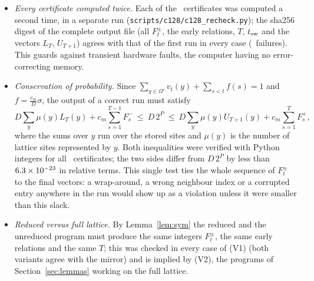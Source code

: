 \begin{itemize}
\item[(V4)] \emph{Every certificate computed twice.} Each of the \XRecheckN\ certificates was computed a second time, in a separate run (\texttt{scripts/c128/c128\_recheck.py}); the sha256 digest of the complete output file (all $F^\pm_t$, the early relations, $T$, $t_{\rm sw}$ and the vectors $L_T$, $U_{T+1}$) agrees with that of the first run in every case (\XRecheckBad\ failures). This guards against transient hardware faults, the computer having no error-correcting memory.
\item[(V5)] \emph{Conservation of probability.} Since $\sum_{y\in\Omega'}v_t(y)+\sum_{s<t}f(s)=1$ and $f=\frac{c_m}{D}\sigma$, the output of a correct run must satisfy
\[
D\sum_{y}\mu(y)L_T(y)+c_m\sum_{s=1}^{T-1}F^-_s\ \le\ D\,2^P\ \le\ D\sum_{y}\mu(y)U_{T+1}(y)+c_m\sum_{s=1}^{T}F^+_s ,
\]
where the sums over $y$ run over the stored sites and $\mu(y)$ is the number of lattice sites represented by $y$. Both inequalities were verified with Python integers for all \XRecheckN\ certificates; the two sides differ from $D\,2^P$ by less than $6.3\times10^{-23}$ in relative terms. This single test ties the whole sequence of $F^\pm_t$ to the final vectors: a wrap-around, a wrong neighbour index or a corrupted entry anywhere in the run would show up as a violation unless it were smaller than this slack.
\item[(V6)] \emph{Reduced versus full lattice.} By Lemma~\ref{lem:sym} the reduced and the unreduced program must produce the same integers $F^\pm_t$, the same early relations and the same $T$; this was checked in every case of (V1) (both variants agree with the mirror) and is implied by (V2), the programs of Section~\ref{sec:lemmas} working on the full lattice.
\end{itemize}
